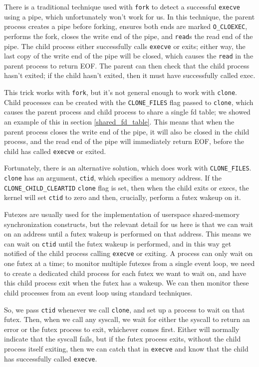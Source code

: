 \documentclass[letterpaper,twocolumn,10pt]{article}
\begin{document}
There is a traditional technique used with \texttt{fork}
to detect a successful \texttt{execve} using a pipe,
which unfortunately won't work for us.
In this technique, the parent process creates a pipe before forking,
ensures both ends are marked \verb|O_CLOEXEC|,
performs the fork,
closes the write end of the pipe,
and \texttt{read}s the read end of the pipe.
The child process either successfully calls \texttt{execve} or exits;
either way, the last copy of the write end of the pipe will be closed,
which causes the \texttt{read} in the parent process to return EOF.
The parent can then check that the child process hasn't exited;
if the child hasn't exited, then it must have successfully called exec.

This trick works with \texttt{fork},
but it's not general enough to work with \texttt{clone}.
Child processes can be created with the \verb|CLONE_FILES| flag passed to \texttt{clone},
which causes the parent process and child process to share a single fd table;
we showed an example of this in section \ref{shared_fd_table}.
This means that when the parent process closes the write end of the pipe,
it will also be closed in the child process,
and the read end of the pipe will immediately return EOF,
before the child has called \texttt{execve} or exited.

Fortunately, there is an alternative solution, which does work with \verb|CLONE_FILES|.
\texttt{clone} has an argument, \texttt{ctid}, which specifies a memory address.
If the \verb|CLONE_CHILD_CLEARTID| \texttt{clone} flag is set,
then when the child exits or execs,
the kernel will set \texttt{ctid} to zero and then,
crucially, perform a futex wakeup on it.

Futexes are usually used for the implementation of userspace shared-memory synchronization constructs,
but the relevant detail for us here is that we can wait on an address
until a futex wakeup is performed on that address.
This means we can wait on \texttt{ctid} until the futex wakeup is performed,
and in this way get notified of the child process calling \texttt{execve} or exiting.
A process can only wait on one futex at a time;
to monitor multiple futexes from a single event loop,
we need to create a dedicated child process for each futex we want to wait on,
and have this child process exit when the futex has a wakeup.
We can then monitor these child processes from an event loop using standard techniques.\cite{signalfd}\cite{pidfd}

So, we pass \texttt{ctid} whenever we call \texttt{clone},
and set up a process to wait on that futex.
Then, when we call any syscall,
we wait for either the syscall to return an error or the futex process to exit,
whichever comes first.
Either will normally indicate that the syscall fails,
but if the futex process exits,
without the child process itself exiting,
then we can catch that in \texttt{execve} and know that the child has successfully called \texttt{execve}.
\end{document}
